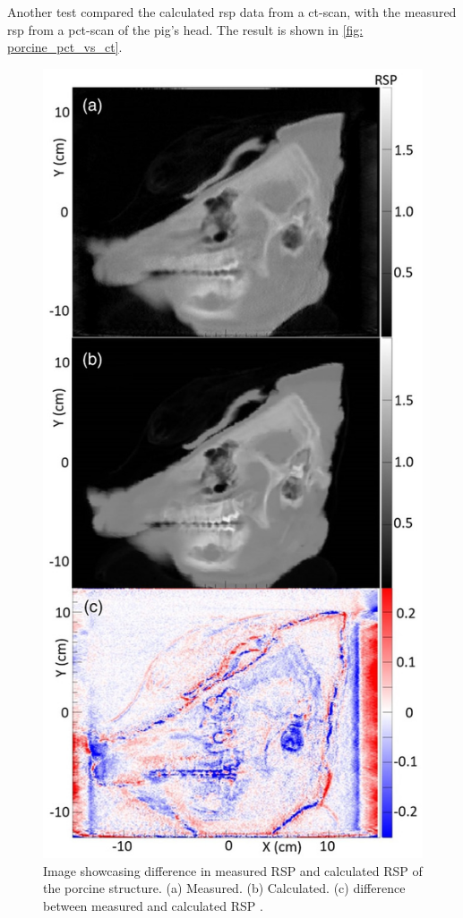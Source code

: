 \documentclass[main.tex]{subfiles}
\begin{document}
Another test compared the calculated \gls{rsp} data from a \gls{ct}-scan, with the measured \gls{rsp} from a \gls{pct}-scan of the pig's head. The result is shown in \autoref{fig: porcine_pct_vs_ct}.

\begin{figure}[!ht]
    \centering
    \includegraphics[scale=2.5]{images/porcine_comparison.jpg}
    \caption{Image showcasing difference in measured RSP and calculated RSP of the porcine structure. (a) Measured. (b) Calculated. (c) difference between measured and calculated RSP \cite{porcine_2021}.}
    \label{fig: porcine_pct_vs_ct}
\end{figure}
\end{document}
